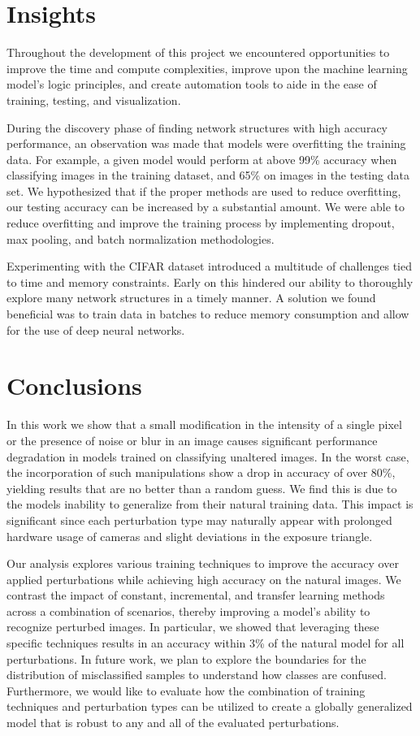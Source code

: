 \documentclass[conference]{IEEEtran}
\begin{document}
\section{Insights}

Throughout the development of this project we encountered opportunities to improve the time and compute complexities, improve upon the machine learning model’s logic principles, and create automation tools to aide in the ease of training, testing, and visualization.

During the discovery phase of finding network structures with high accuracy performance, an observation was made that models were overfitting the training data. For example, a given model would perform at above 99\% accuracy when classifying images in the training dataset, and 65\% on images in the testing data set. We hypothesized that if the proper methods are used to reduce overfitting, our testing accuracy can be increased by a substantial amount. We were able to reduce overfitting and improve the training process by implementing dropout, max pooling, and batch normalization methodologies.

Experimenting with the CIFAR dataset introduced a multitude of challenges tied to time and memory constraints. Early on this hindered our ability to thoroughly explore many network structures in a timely manner. A solution we found beneficial was to train data in batches to reduce memory consumption and allow for the use of deep neural networks.

\section{Conclusions}

In this work we show that a small modification in the intensity of a single pixel or the presence of noise or blur in an image causes significant performance degradation in models trained on classifying unaltered images. In the worst case, the incorporation of such manipulations show a drop in accuracy of over 80\%, yielding results that are no better than a random guess. We find this is due to the models inability to generalize from their natural training data. This impact is significant since each perturbation type may naturally appear with prolonged hardware usage of cameras and slight deviations in the exposure triangle. 

Our analysis explores various training techniques to improve the accuracy over applied perturbations while achieving high accuracy on the natural images. We contrast the impact of constant, incremental, and transfer learning methods across a combination of scenarios, thereby improving a model’s ability to recognize perturbed images. In particular, we showed that leveraging these specific techniques results in an accuracy within 3\% of the natural model for all perturbations. In future work, we plan to explore the boundaries for the distribution of misclassified samples to understand how classes are confused. Furthermore, we would like to evaluate how the combination of training techniques and perturbation types can be utilized to create a globally generalized model that is robust to any and all of the evaluated perturbations.
\end{document}
